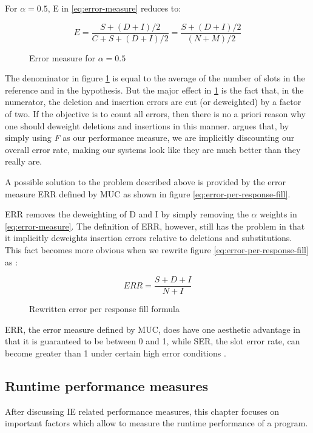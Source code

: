 For $\alpha = 0.5$, E in \ref{eq:error-measure} reduces to:

\begin{figure}[H]
\begin{displaymath}
	E = \frac{S + (D+I)/2}{C+S+(D+I)/2} = \frac{S + (D+I)/2}{(N+M)/2}
\end{displaymath}
\caption{Error measure for $\alpha = 0.5$}
\label{eq:error-measure2}
\end{figure}

The denominator in figure \ref{eq:error-measure2} is equal to the average of the number of slots in the reference and in the hypothesis. But the major effect in \ref{eq:error-measure2} is the fact that, in the numerator, the deletion and insertion errors are cut (or deweighted) by a factor of two. If the objective is to count all errors, then there is no a priori reason why one should deweight deletions and insertions in this manner.  \cite{Makhoul:1999} argues that, by simply using \textit{F} as our performance measure, we are implicitly discounting our overall error rate, making our systems look like they are much better than they really are.

A possible solution to the problem described above is provided by the error measure ERR defined by MUC \cite{Chinchor:1995}\cite{Makhoul:1999} as shown in figure \ref{eq:error-per-response-fill}.

ERR removes the deweighting of D and I by simply removing the $\alpha$ weights in \ref{eq:error-measure}. The definition of ERR, however, still has the problem in that it implicitly deweights insertion errors relative to deletions and substitutions. This fact becomes more obvious when we rewrite figure \ref{eq:error-per-response-fill} as \cite{Makhoul:1999}:

\begin{figure}[H]
\begin{displaymath}
	ERR = \frac{S+D+I}{N+I}
\end{displaymath}
\caption{Rewritten error per response fill formula}
\label{eq:error-per-response-fill2}
\end{figure}

ERR, the error measure defined by MUC, does have one aesthetic advantage in that it is guaranteed to be between 0 and 1, while SER, the slot error rate, can become greater than 1 under certain high error conditions \cite{Makhoul:1999}.

\subsection{Runtime performance measures}
After discussing \gls{IE} related performance measures, this chapter focuses on important factors which allow to measure the runtime performance of a program.

